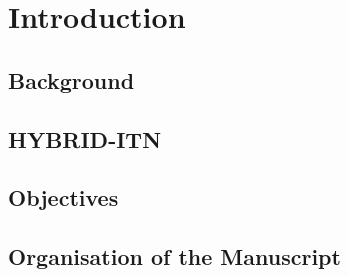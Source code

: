 \chapter{Introduction}

\section{Background}


\section{HYBRID-ITN}


\section{Objectives}



\section{Organisation of the Manuscript}
